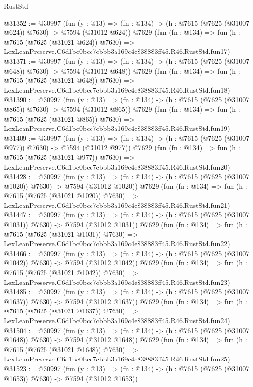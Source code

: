 \begin{lexlean}{RustStd}
\begin{coremodule}
@31352 := @30997
    (fun (y : @13) => (fn : @134) -> (h : @7615 (@7625 (@31007 @624)) @7630) -> @7594 (@31012 @624))
    @7629
    (fun (fn : @134) =>
    fun (h : @7615 (@7625 (@31021 @624)) @7630) =>
    LexLeanPreserve.C6d1bc0bcc7cbbb3a169c4e838883ff45.R46.RustStd.fun17)
@31371 := @30997
    (fun (y : @13) => (fn : @134) -> (h : @7615 (@7625 (@31007 @648)) @7630) -> @7594 (@31012 @648))
    @7629
    (fun (fn : @134) =>
    fun (h : @7615 (@7625 (@31021 @648)) @7630) =>
    LexLeanPreserve.C6d1bc0bcc7cbbb3a169c4e838883ff45.R46.RustStd.fun18)
@31390 := @30997
    (fun (y : @13) => (fn : @134) -> (h : @7615 (@7625 (@31007 @865)) @7630) -> @7594 (@31012 @865))
    @7629
    (fun (fn : @134) =>
    fun (h : @7615 (@7625 (@31021 @865)) @7630) =>
    LexLeanPreserve.C6d1bc0bcc7cbbb3a169c4e838883ff45.R46.RustStd.fun19)
@31409 := @30997
    (fun (y : @13) => (fn : @134) -> (h : @7615 (@7625 (@31007 @977)) @7630) -> @7594 (@31012 @977))
    @7629
    (fun (fn : @134) =>
    fun (h : @7615 (@7625 (@31021 @977)) @7630) =>
    LexLeanPreserve.C6d1bc0bcc7cbbb3a169c4e838883ff45.R46.RustStd.fun20)
@31428 := @30997
    (fun (y : @13) =>
    (fn : @134) -> (h : @7615 (@7625 (@31007 @1020)) @7630) -> @7594 (@31012 @1020))
    @7629
    (fun (fn : @134) =>
    fun (h : @7615 (@7625 (@31021 @1020)) @7630) =>
    LexLeanPreserve.C6d1bc0bcc7cbbb3a169c4e838883ff45.R46.RustStd.fun21)
@31447 := @30997
    (fun (y : @13) =>
    (fn : @134) -> (h : @7615 (@7625 (@31007 @1031)) @7630) -> @7594 (@31012 @1031))
    @7629
    (fun (fn : @134) =>
    fun (h : @7615 (@7625 (@31021 @1031)) @7630) =>
    LexLeanPreserve.C6d1bc0bcc7cbbb3a169c4e838883ff45.R46.RustStd.fun22)
@31466 := @30997
    (fun (y : @13) =>
    (fn : @134) -> (h : @7615 (@7625 (@31007 @1042)) @7630) -> @7594 (@31012 @1042))
    @7629
    (fun (fn : @134) =>
    fun (h : @7615 (@7625 (@31021 @1042)) @7630) =>
    LexLeanPreserve.C6d1bc0bcc7cbbb3a169c4e838883ff45.R46.RustStd.fun23)
@31485 := @30997
    (fun (y : @13) =>
    (fn : @134) -> (h : @7615 (@7625 (@31007 @1637)) @7630) -> @7594 (@31012 @1637))
    @7629
    (fun (fn : @134) =>
    fun (h : @7615 (@7625 (@31021 @1637)) @7630) =>
    LexLeanPreserve.C6d1bc0bcc7cbbb3a169c4e838883ff45.R46.RustStd.fun24)
@31504 := @30997
    (fun (y : @13) =>
    (fn : @134) -> (h : @7615 (@7625 (@31007 @1648)) @7630) -> @7594 (@31012 @1648))
    @7629
    (fun (fn : @134) =>
    fun (h : @7615 (@7625 (@31021 @1648)) @7630) =>
    LexLeanPreserve.C6d1bc0bcc7cbbb3a169c4e838883ff45.R46.RustStd.fun25)
@31523 := @30997
    (fun (y : @13) =>
    (fn : @134) -> (h : @7615 (@7625 (@31007 @1653)) @7630) -> @7594 (@31012 @1653))

\end{coremodule}
\end{lexlean}

